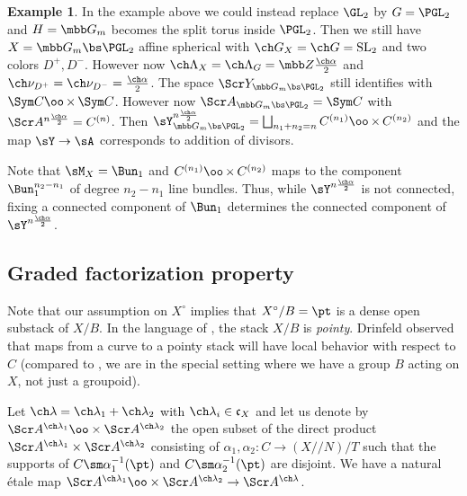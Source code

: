 \documentclass[final]{amsart}
\theoremstyle{remark}
\theoremstyle{definition}
\newtheorem{eg}[subsubsection]{Example}
\DeclareMathOperator*{\xt}{\times}
\numberwithin{equation}{section}
\begin{document}
\begin{eg} \label{eg:YHeckePGL}
In the example above we could instead replace $\GL_2$ by $G = \PGL_2$ and 
$H = \mbb G_m$ becomes the split torus inside $\PGL_2$. 
Then we still have $X = \mbb G_m\bs \PGL_2$ affine spherical with $\ch G_X = \ch G = \mathrm{SL}_2$ and two colors $D^+,D^-$. 
However now $\ch\Lambda_X = \ch\Lambda_G = \mbb Z \frac {\ch\alpha}2$ 
and $\ch\nu_{D^+} = \ch\nu_{D^-} = \frac {\ch\alpha}2$. 
The space $\Scr Y_{\mbb G_m \bs \PGL_2}$ still identifies with 
$\Sym C \oo\xt \Sym C$. However now $\Scr A_{\mbb G_m \bs \PGL_2} = \Sym C$
with $\Scr A^{n \frac{\ch\alpha}2} = C^{(n)}$. 
Then $\sY_{\mbb G_m \bs \PGL_2}^{n \frac{\ch\alpha}2} = \bigsqcup_{n_1+n_2=n} C^{(n_1)}\oo\xt C^{(n_2)}$ and the map $\sY \to \sA$ corresponds to addition of divisors.

Note that $\sM_X = \Bun_1$ and $C^{(n_1)}\oo\xt C^{(n_2)}$ maps to the component 
$\Bun_1^{n_2-n_1}$ of degree $n_2-n_1$ line bundles. 
Thus, while $\sY^{n \frac{\ch\alpha}2}$ is not connected, 
fixing a connected component of $\Bun_1$ determines the connected
component of $\sY^{n \frac{\ch\alpha}2}$.
\end{eg}


\subsection{Graded factorization property}
Note that our assumption on $X^\circ$ implies that $X^\circ/B=\pt$ is a dense open
substack of $X/B$. In the language of \cite[\S 4.2.1]{Drinfeld}, the stack $X/B$ is \emph{pointy}. Drinfeld observed that maps from a curve to a pointy stack will have local
behavior with respect to $C$ (compared to \cite{Drinfeld}, we are in the special
setting where we have a group $B$ acting on $X$, not just a groupoid).


Let $\ch\lambda = \ch\lambda_1 + \ch\lambda_2$ with $\ch\lambda_i \in \mathfrak c_X$ and let us denote by $\Scr A^{\ch\lambda_1} \oo\times \Scr A^{\ch\lambda_2}$ the open subset of the direct product $\Scr A^{\ch\lambda_1} \times \Scr A^{\ch\lambda_2}$ consisting of $\alpha_1,\alpha_2 : C \to (X/\!\!/N)/T$ such that
the supports of $C\sm \alpha_1^{-1}(\pt)$ and $C\sm \alpha_2^{-1}(\pt)$ are 
disjoint. 
We have a natural \'etale map $\Scr A^{\ch\lambda_1} \oo\times \Scr A^{\ch\lambda_2} \to \Scr A^{\ch\lambda}$.
\end{document}

